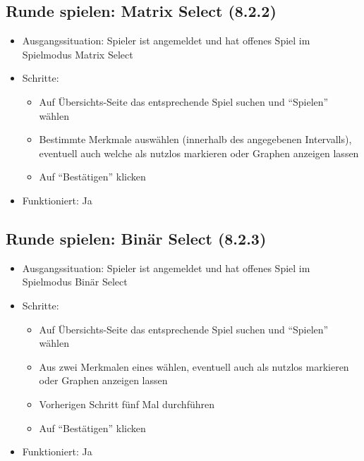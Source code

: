 \documentclass[a4paper]{scrreprt}
\begin{document}
            \subsection{Runde spielen: Matrix Select (8.2.2)}
            \begin{itemize}
                \item Ausgangssituation: Spieler ist angemeldet und hat offenes Spiel im Spielmodus Matrix Select
                \item Schritte:
                    \begin{itemize}
                        \item Auf Übersichts-Seite das entsprechende Spiel suchen und \enquote{Spielen} wählen
                        \item Bestimmte Merkmale auswählen (innerhalb des angegebenen Intervalls), eventuell auch welche als nutzlos markieren oder Graphen anzeigen lassen
                        \item Auf \enquote{Bestätigen} klicken
                    \end{itemize}
                \item Funktioniert: Ja
            \end{itemize}

            \subsection{Runde spielen: Binär Select (8.2.3)}
            \begin{itemize}
                \item Ausgangssituation: Spieler ist angemeldet und hat offenes Spiel im Spielmodus Binär Select
                \item Schritte:
                    \begin{itemize}
                        \item Auf Übersichts-Seite das entsprechende Spiel suchen und \enquote{Spielen} wählen
                        \item Aus zwei Merkmalen eines wählen, eventuell auch als nutzlos markieren oder Graphen anzeigen lassen
                        \item Vorherigen Schritt fünf Mal durchführen
                        \item Auf \enquote{Bestätigen} klicken
                    \end{itemize}
                \item Funktioniert: Ja
            \end{itemize}
\end{document}
